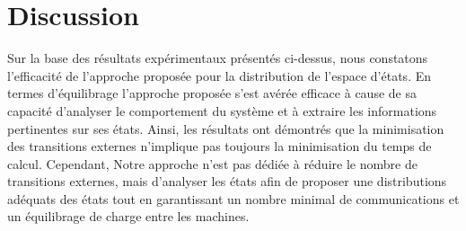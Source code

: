 \section{Discussion}

Sur la base des résultats expérimentaux présentés ci-dessus, nous constatons l’efficacité de l’approche proposée pour la distribution de l’espace d'états. En termes d’équilibrage l’approche proposée s’est avérée efficace à cause de sa capacité d’analyser le comportement du système et à extraire les informations pertinentes sur ses états. Ainsi, les résultats ont démontrés que la minimisation des transitions externes n'implique pas toujours la minimisation du temps de calcul. Cependant, Notre approche n'est pas dédiée à réduire le nombre de transitions externes, mais d'analyser les états afin de proposer une distributions adéquats des états tout en garantissant un nombre minimal de communications et un équilibrage de charge entre les machines.
